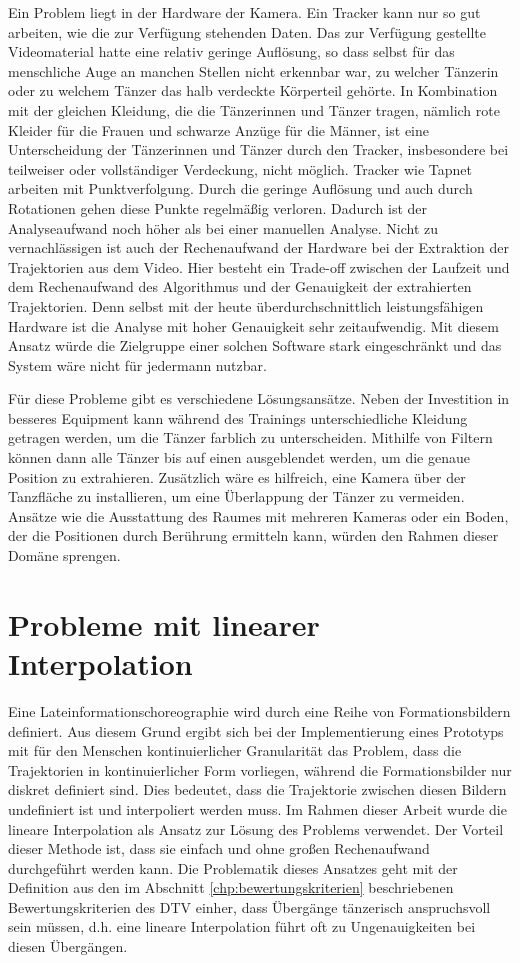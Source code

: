 \documentclass[
  ngerman,
  a4paper,  %
  twoside,  %
  bibliography=totoc,
  headsepline,
  cleardoublepage=empty,
  parskip=half,
  draft=false
]{scrbook}
\begin{document}
Ein Problem liegt in der Hardware der Kamera. Ein Tracker kann nur so gut arbeiten, wie die zur Verfügung stehenden Daten. Das zur Verfügung gestellte Videomaterial hatte eine relativ geringe Auflösung, so dass selbst für das menschliche Auge an manchen Stellen nicht erkennbar war, zu welcher Tänzerin oder zu welchem Tänzer das halb verdeckte Körperteil gehörte. In Kombination mit der gleichen Kleidung, die die Tänzerinnen und Tänzer tragen, nämlich rote Kleider für die Frauen und schwarze Anzüge für die Männer, ist eine Unterscheidung der Tänzerinnen und Tänzer durch den Tracker, insbesondere bei teilweiser oder vollständiger Verdeckung, nicht möglich. Tracker wie Tapnet arbeiten mit Punktverfolgung. Durch die geringe Auflösung und auch durch Rotationen gehen diese Punkte regelmäßig verloren. Dadurch ist der Analyseaufwand noch höher als bei einer manuellen Analyse. Nicht zu vernachlässigen ist auch der Rechenaufwand der Hardware bei der Extraktion der Trajektorien aus dem Video. Hier besteht ein Trade-off zwischen der Laufzeit und dem Rechenaufwand des Algorithmus und der Genauigkeit der extrahierten Trajektorien. Denn selbst mit der heute überdurchschnittlich leistungsfähigen Hardware ist die Analyse mit hoher Genauigkeit sehr zeitaufwendig. Mit diesem Ansatz würde die Zielgruppe einer solchen Software stark eingeschränkt und das System wäre nicht für jedermann nutzbar.

Für diese Probleme gibt es verschiedene Lösungsansätze. Neben der Investition in besseres Equipment kann während des Trainings unterschiedliche Kleidung getragen werden, um die Tänzer farblich zu unterscheiden. Mithilfe von Filtern können dann alle Tänzer bis auf einen ausgeblendet werden, um die genaue Position zu extrahieren. Zusätzlich wäre es hilfreich, eine Kamera über der Tanzfläche zu installieren, um eine Überlappung der Tänzer zu vermeiden. Ansätze wie die Ausstattung des Raumes mit mehreren Kameras oder ein Boden, der die Positionen durch Berührung ermitteln kann, würden den Rahmen dieser Domäne sprengen.

\section{Probleme mit linearer Interpolation}
Eine Lateinformationschoreographie wird durch eine Reihe von Formationsbildern definiert. Aus diesem Grund ergibt sich bei der Implementierung eines Prototyps mit für den Menschen kontinuierlicher Granularität das Problem, dass die Trajektorien in kontinuierlicher Form vorliegen, während die Formationsbilder nur diskret definiert sind. Dies bedeutet, dass die Trajektorie zwischen diesen Bildern undefiniert ist und interpoliert werden muss. Im Rahmen dieser Arbeit wurde die lineare Interpolation als Ansatz zur Lösung des Problems verwendet. Der Vorteil dieser Methode ist, dass sie einfach und ohne großen Rechenaufwand durchgeführt werden kann. Die Problematik dieses Ansatzes geht mit der Definition aus den im Abschnitt \ref{chp:bewertungskriterien} beschriebenen Bewertungskriterien des DTV \cite{wertungsrichtlinien} einher, dass Übergänge tänzerisch anspruchsvoll sein müssen, d.h. eine lineare Interpolation führt oft zu Ungenauigkeiten bei diesen Übergängen.
\end{document}
